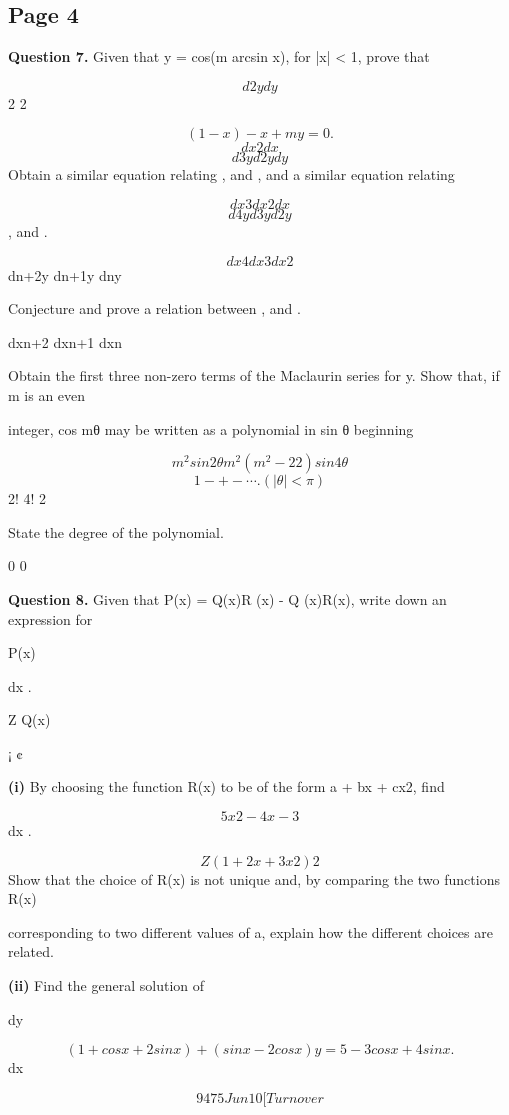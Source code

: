 \documentclass[12pt]{article}
\begin{document}
\subsection*{Page 4}
\begin{flushleft}
\bigskip\textbf{Question 7.} Given that y = cos(m arcsin x), for |x| < 1, prove that\par
\[d2y dy\]
2 2\par
\[(1 - x ) - x + m y = 0 .\]
\[dx2 dx\]
\[d3y d2y dy\]
Obtain a similar equation relating , and , and a similar equation relating\par
\[dx3 dx2 dx\]
\[d4y d3y d2y\]
, and .\par
\[dx4 dx3 dx2\]
dn+2y dn+1y dny\par
Conjecture and prove a relation between , and .\par
dxn+2 dxn+1 dxn\par
Obtain the first three non-zero terms of the Maclaurin series for y. Show that, if m is an even\par
integer, cos mθ may be written as a polynomial in sin θ beginning\par
\[m^2 sin 2 θ m^2(m^2 - 22) sin 4 θ\]
\[1 - + - \cdots . (|θ| < \pi)\]
2! 4! 2\par
State the degree of the polynomial.\par
0 0\par
\bigskip\textbf{Question 8.} Given that P(x) = Q(x)R (x) - Q (x)R(x), write down an expression for\par
P(x)\par
dx .\par
Z Q(x)\par
¡ ¢\par
\textbf{(i)} By choosing the function R(x) to be of the form a + bx + cx2, find\par
\[5x2 - 4x - 3\]
dx .\par
\[Z (1 + 2x + 3x2)2\]
Show that the choice of R(x) is not unique and, by comparing the two functions R(x)\par
corresponding to two different values of a, explain how the different choices are related.\par
\textbf{(ii)} Find the general solution of\par
dy\par
\[(1 + cos x + 2 sin x) + (sin x - 2 cos x)y = 5 - 3 cos x + 4 sin x .\]
dx\par
\[9475 Jun10 [Turn over\]
\end{flushleft}
\end{document}
